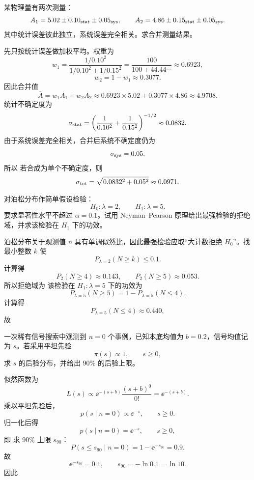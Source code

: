 \begin{question}
某物理量有两次测量：
\[
A_1=5.02\pm0.10_{\rm stat}\pm0.05_{\rm sys},
\qquad
A_2=4.86\pm0.15_{\rm stat}\pm0.05_{\rm sys}.
\]
其中统计误差彼此独立，系统误差完全相关。求合并测量结果。
\begin{solution}
先只按统计误差做加权平均。权重为
\[
w_1=\frac{1/0.10^2}{1/0.10^2+1/0.15^2}
=\frac{100}{100+44.44\cdots}\approx 0.6923,
\]
\[
w_2=1-w_1\approx 0.3077.
\]
因此合并值
\[
\bar A=w_1A_1+w_2A_2
\approx 0.6923\times 5.02+0.3077\times 4.86
\approx 4.9708.
\]
统计不确定度为
\[
\sigma_{\rm stat}
=\left(\frac1{0.10^2}+\frac1{0.15^2}\right)^{-1/2}
\approx 0.0832.
\]
由于系统误差完全相关，合并后系统不确定度仍为
\[
\sigma_{\rm sys}=0.05.
\]
所以
若合成为单个不确定度，则
\[
\sigma_{\rm tot}=\sqrt{0.0832^2+0.05^2}\approx 0.0971.
\]
\end{solution}
\end{question}

\begin{question}
对泊松分布作简单假设检验：
\[
H_0:\lambda=2,\qquad H_1:\lambda=5.
\]
要求显著性水平不超过 $\alpha=0.1$。试用 Neyman--Pearson 原理给出最强检验的拒绝域，并求该检验在 $H_1$ 下的功效。
\begin{solution}
泊松分布关于观测值 $n$ 具有单调似然比，因此最强检验应取“大计数拒绝 $H_0$”。找最小整数 $k$ 使
\[
P_{\lambda=2}(N\ge k)\le 0.1.
\]
计算得
\[
P_{2}(N\ge 4)\approx 0.143,\qquad P_{2}(N\ge 5)\approx 0.053.
\]
所以拒绝域为
该检验在 $H_1:\lambda=5$ 下的功效为
\[
P_{\lambda=5}(N\ge 5)=1-P_{\lambda=5}(N\le 4).
\]
计算得
\[
P_{\lambda=5}(N\le 4)\approx 0.440,
\]
故
\end{solution}
\end{question}

\begin{question}
一次稀有信号搜索中观测到 $n=0$ 个事例，已知本底均值为 $b=0.2$，信号均值记为 $s$。若采用平坦先验
\[
\pi(s)\propto 1,\qquad s\ge 0,
\]
求 $s$ 的后验分布，并给出 $90\%$ 的后验上限。
\begin{solution}
似然函数为
\[
L(s)\propto \ee^{-(s+b)}\frac{(s+b)^0}{0!}=\ee^{-(s+b)}.
\]
乘以平坦先验后，
\[
p(s\mid n=0)\propto \ee^{-s},\qquad s\ge 0.
\]
归一化后得
\[
p(s\mid n=0)=\ee^{-s},\qquad s\ge 0,
\]
即
求 $90\%$ 上限 $s_{90}$：
\[
P(s\le s_{90}\mid n=0)=1-\ee^{-s_{90}}=0.9.
\]
故
\[
\ee^{-s_{90}}=0.1,\qquad s_{90}=-\ln 0.1=\ln 10.
\]
因此
\end{solution}
\end{question}

